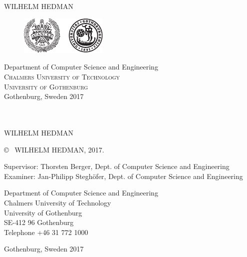\newpage
\thispagestyle{empty}
\begin{center}
\vspace*{4.5cm}
	\textbf{\Large \toptitle\\ \bottomtitle} \\[1cm]
	{\large WILHELM HEDMAN}
	
	\vfill	
	\begin{figure}[H]
	\centering
	\includegraphics[width=0.4\pdfpagewidth]{figure/auxiliary/logo_ch_gu.pdf}
	\end{figure}	\vspace{5mm}	
	
	Department of Computer Science and Engineering \\
	\textsc{Chalmers University of Technology} \\
	\textsc{University of Gothenburg} \\
	Gothenburg, Sweden 2017 \\
\end{center}


\newpage
\thispagestyle{plain}
\vspace*{4.5cm}
\fullt\\
\subt\\
WILHELM HEDMAN \setlength{\parskip}{1cm}

\copyright ~ WILHELM HEDMAN, 2017. \setlength{\parskip}{1cm}

Supervisor: Thorsten Berger, Dept. of Computer Science and Engineering\\
Examiner: Jan-Philipp Steghöfer, Dept. of Computer Science and Engineering \setlength{\parskip}{1cm}

Department of Computer Science and Engineering\\
Chalmers University of Technology\\
University of Gothenburg\\
SE-412 96 Gothenburg\\
Telephone +46 31 772 1000 \setlength{\parskip}{0.5cm}

\vfill


Gothenburg, Sweden 2017


